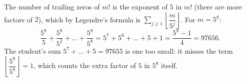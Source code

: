 The number of trailing zeros of $m!$ is the exponent of $5$ in $m!$ (there are more factors of $2$), which by Legendre's formula is $\sum_{j\ge1}\left\lfloor\dfrac{m}{5^j}\right\rfloor$. For $m=5^8$:
\[
\dfrac{5^8}{5}+\dfrac{5^8}{5^2}+\dots+\dfrac{5^8}{5^8}=5^7+5^6+\dots+5+1=\dfrac{5^8-1}{4}=\boxed{97656}.
\]
The student's sum $5^7+\dots+5=97655$ is one too small: it misses the term $\left\lfloor\dfrac{5^8}{5^8}\right\rfloor=1$, which counts the extra factor of $5$ in $5^8$ itself.
